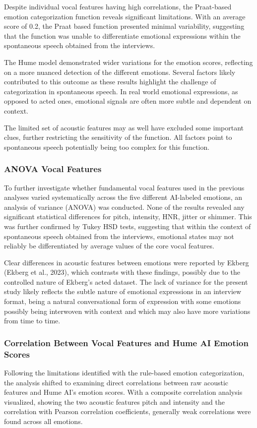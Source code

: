 Despite individual vocal features having high correlations, the Praat-based emotion categorization function reveals significant limitations. With an average score of 0.2, the Praat based function presented minimal variability, suggesting that the function was unable to differentiate emotional expressions within the spontaneous speech obtained from the interviews.

The Hume model demonstrated wider variations for the emotion scores, reflecting on a more nuanced detection of the different emotions. 
Several factors likely contributed to this outcome as these results highlight the challenge of categorization in spontaneous speech. In real world emotional expressions, as opposed to acted ones, emotional signals are often more subtle and dependent on context. 

The limited set of acoustic features may as well have excluded some important clues, further restricting the sensitivity of the function. All factors point to spontaneous speech potentially being too complex for this function.

\subsubsection{ANOVA Vocal Features}
To further investigate whether fundamental vocal features used in the previous analyses varied systematically across the five different AI-labeled emotions, an analysis of variance (ANOVA) was conducted. None of the results revealed any significant statistical differences for pitch, intensity, HNR, jitter or shimmer. This was further confirmed by Tukey HSD tests, suggesting that within the context of spontaneous speech obtained from the interviews, emotional states may not reliably be differentiated by average values of the core vocal features.

Clear differences in acoustic features between emotions were reported by Ekberg (Ekberg et al., 2023), which contrasts with these findings, possibly due to the controlled nature of Ekberg’s acted dataset.
The lack of variance for the present study likely reflects the subtle nature of emotional expressions in an interview format, being a natural conversational form of expression with some emotions possibly being interwoven with context and which may also have more variations from time to time.

\subsubsection{Correlation Between Vocal Features and Hume AI Emotion Scores}
Following the limitations identified with the rule-based emotion categorization, the analysis shifted to examining direct correlations between raw acoustic features and Hume AI’s emotion scores. 
With a composite correlation analysis visualized, showing the two acoustic features pitch and intensity and the correlation with Pearson correlation coeﬀicients, generally weak correlations were found across all emotions. 

